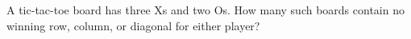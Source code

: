A tic-tac-toe board has three Xs and two Os. How many such boards contain no winning row, column, or diagonal for either player?
